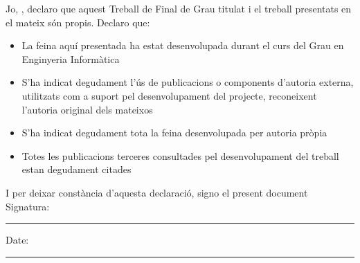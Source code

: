 \documentclass[
11pt, %
catalan, %
singlespacing, %
headsepline, %
]{MastersDoctoralThesis} %
\begin{document}

\begin{declaration}
\addchaptertocentry{\authorshipname} %
\noindent Jo, \authorname, declaro que aquest Treball de Final de Grau titulat \textit{\ttitle}
i el treball presentats en el mateix són propis. Declaro que:

\begin{itemize} 
\item La feina aquí presentada ha estat desenvolupada durant el curs del Grau en Enginyeria Informàtica
\item S'ha indicat degudament l'ús de publicacions o components d'autoria externa, utilitzats com a suport pel desenvolupament del projecte, reconeixent l'autoria original dels mateixos
\item S'ha indicat degudament tota la feina desenvolupada per autoria pròpia
\item Totes les publicacions terceres consultades pel desenvolupament del treball estan degudament citades
\end{itemize}
\noindent I per deixar constància d'aquesta declaració, signo el present document\\[2cm]
 
\noindent Signatura:\\
\rule[2cm]{25em}{0.5pt} %
 
\noindent Date:\\
\rule[0.5em]{25em}{0.5pt} %
\end{declaration}

\clearpage



\end{document}

